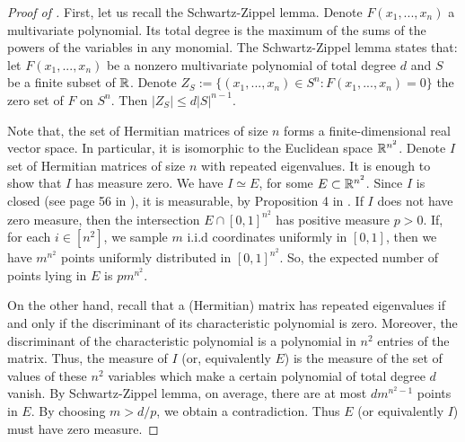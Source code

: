 \begin{proof}[Proof of ]
  First, let us recall the Schwartz-Zippel lemma. Denote $F(x_1, ..., x_n)$ a multivariate polynomial.
  Its total degree is the maximum of the sums of the powers of the variables in any monomial.
  The Schwartz-Zippel lemma states that: let $F(x_1, ..., x_n)$ be a nonzero multivariate polynomial
  of total degree $d$ and $S$ be a finite subset of $\mathbb R$. Denote
  $Z_S := \{ (x_1, ..., x_n) \in S^n : F(x_1, ..., x_n) = 0 \}$ the zero set of $F$ on $S^n$.
  Then $| Z_S | \leq d |S|^{n-1}$.

  Note that, the set of Hermitian matrices of size $n$ forms a finite-dimensional real vector space.
  In particular, it is isomorphic to the Euclidean space $\mathbb R^{n^2}$.
  Denote $I$ set of Hermitian matrices of size $n$ with repeated eigenvalues.
  It is enough to show that $I$ has measure zero. We have $I \simeq E$,
  for some $E \subset \mathbb R^{n^2}$. Since $I$ is closed (see page 56 in \citep{Tao12}),
  it is measurable, by Proposition 4 in \citep{Stein05}. If $I$ does not have zero measure,
  then the intersection $E \cap [0, 1]^{n^2}$ has positive measure $p > 0$. If,
  for each $i \in [n^2]$, we sample $m$ i.i.d coordinates uniformly in $[0, 1]$,
  then we have $m^{n^2}$ points uniformly distributed in $[0, 1]^{n^2}$. So,
  the expected number of points lying in $E$ is $pm^{n^2}$.

  On the other hand, recall that a (Hermitian) matrix has repeated eigenvalues if and only if
  the discriminant of its characteristic polynomial is zero. Moreover,
  the discriminant of the characteristic polynomial is a polynomial in $n^2$ entries of the matrix.
  Thus, the measure of $I$ (or, equivalently $E$) is the measure of the set of values of these
  $n^2$ variables which make a certain polynomial of total degree $d$ vanish.
  By Schwartz-Zippel lemma, on average, there are at most $d m^{n^2-1}$ points in $E$.
  By choosing $m > d / p$, we obtain a contradiction. Thus $E$ (or equivalently $I$)
  must have zero measure.
\end{proof}

